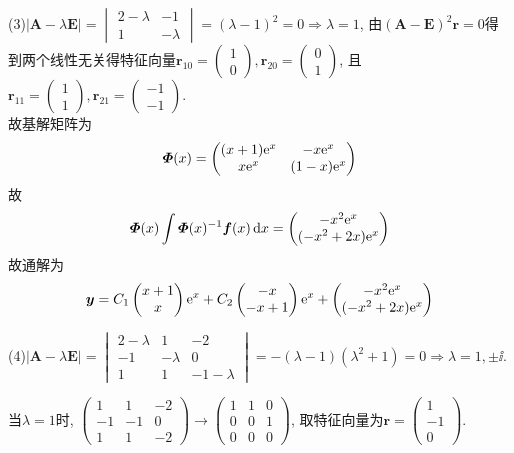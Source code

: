 \begin{solve}
(3)$|\bm{A}-\lambda\bm{E}|=\begin{vmatrix}2-\lambda&-1\\1&-\lambda\end{vmatrix}=(\lambda-1)^2=0\Rightarrow\lambda=1$, 由$(\bm{A}-\bm{E})^2\bm{r}=0$得到两个线性无关得特征向量$\bm{r}_{10}=\begin{pmatrix}1\\0\end{pmatrix},\bm{r}_{20}=\begin{pmatrix}0\\1\end{pmatrix}$, 且$\bm{r}_{11}=\begin{pmatrix}1\\1\end{pmatrix},\bm{r}_{21}=\begin{pmatrix}-1\\-1\end{pmatrix}$.\\
故基解矩阵为
\[\bm{\varPhi}(x)=\begin{pmatrix}(x+1)\mathrm{e}^x&-x\mathrm{e}^x\\x\mathrm{e}^x&(1-x)\mathrm{e}^x\end{pmatrix}\]
故
\[\bm{\varPhi}(x)\int\bm{\varPhi}(x)^{-1}\bm{f}(x)\,\mathrm{d} x=\begin{pmatrix}-x^2\mathrm{e}^x\\(-x^2+2x)\mathrm{e}^x\end{pmatrix}\]
故通解为
\[\bm{y}=C_1\begin{pmatrix}x+1\\x\end{pmatrix}\mathrm{e}^x+C_2\begin{pmatrix}-x\\-x+1\end{pmatrix}\mathrm{e}^x+\begin{pmatrix}-x^2\mathrm{e}^x\\(-x^2+2x)\mathrm{e}^x\end{pmatrix}\]

(4)$|\bm{A}-\lambda\bm{E}|=\begin{vmatrix}2-\lambda&1&-2\\-1&-\lambda&0\\1&1&-1-\lambda\end{vmatrix}=-(\lambda-1)(\lambda^2+1)=0\Rightarrow\lambda=1,\pm\ii$.

当$\lambda=1$时, $\begin{pmatrix}1&1&-2\\-1&-1&0\\1&1&-2\end{pmatrix}\to\begin{pmatrix}1&1&0\\0&0&1\\0&0&0\end{pmatrix}$, 
取特征向量为$\bm{r}=\begin{pmatrix}1\\-1\\0\end{pmatrix}$.


\end{solve}

